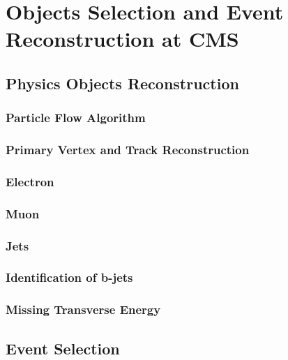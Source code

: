 \graphicspath{{chapt_dutch/}{intro/}{chapt2/}{chapt3/}{chapt4/}{chapt5/}{chapt6/}{chapt7/}{chapt8/}}

\renewcommand\evenpagerightmark{{\scshape\small Chapter 5}}
\renewcommand\oddpageleftmark{{\scshape\small Objects selection and Event Reconstruction}}

\hyphenation{}

\chapter[Physics Objects Selection and Event Reconstruction at CMS]%
{Objects Selection and Event Reconstruction at CMS}
\label{chapt:5}

\section{Physics Objects Reconstruction}\label{sec:Obj_reco}
\subsection{Particle Flow Algorithm}\label{subsec:pfa}
\subsection{Primary Vertex and Track Reconstruction}\label{subsec:pvt}
\subsection{Electron}\label{subsec:electron}
\subsection{Muon}\label{subsec:muon}
\subsection{Jets}\label{subsec:jets}
\subsection{Identification of b-jets}
\subsection{Missing Transverse Energy}\label{subsec:met}
\section{Event Selection}\label{sec:Evnt_selec}
